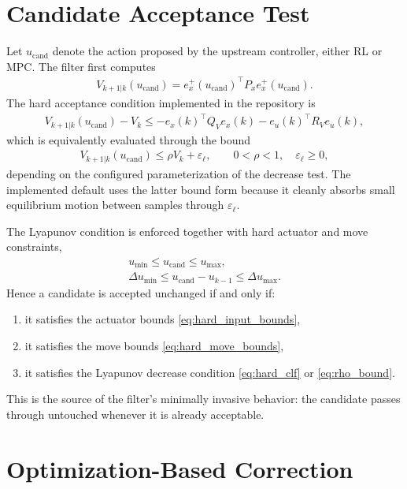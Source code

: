 \documentclass[11pt]{article}
\begin{document}
\section{Candidate Acceptance Test}
Let $u_{\mathrm{cand}}$ denote the action proposed by the upstream controller, either RL or MPC. The filter first computes
\begin{align}
V_{k+1|k}(u_{\mathrm{cand}})
= e_x^+(u_{\mathrm{cand}})^\top P_x e_x^+(u_{\mathrm{cand}}). \label{eq:V_next_cand}
\end{align}
The hard acceptance condition implemented in the repository is
\begin{align}
V_{k+1|k}(u_{\mathrm{cand}}) - V_k
\le
-e_x(k)^\top Q_V e_x(k) - e_u(k)^\top R_V e_u(k), \label{eq:hard_clf}
\end{align}
which is equivalently evaluated through the bound
\begin{align}
V_{k+1|k}(u_{\mathrm{cand}}) \le \rho V_k + \varepsilon_{\ell}, \qquad 0 < \rho < 1, \quad \varepsilon_{\ell}\ge 0, \label{eq:rho_bound}
\end{align}
depending on the configured parameterization of the decrease test. The implemented default uses the latter bound form because it cleanly absorbs small equilibrium motion between samples through $\varepsilon_{\ell}$.

The Lyapunov condition is enforced together with hard actuator and move constraints,
\begin{align}
u_{\min} \le u_{\mathrm{cand}} \le u_{\max}, \label{eq:hard_input_bounds}\\
\Delta u_{\min} \le u_{\mathrm{cand}} - u_{k-1} \le \Delta u_{\max}. \label{eq:hard_move_bounds}
\end{align}
Hence a candidate is accepted unchanged if and only if:
\begin{enumerate}[leftmargin=*]
\item it satisfies the actuator bounds \eqref{eq:hard_input_bounds},
\item it satisfies the move bounds \eqref{eq:hard_move_bounds},
\item it satisfies the Lyapunov decrease condition \eqref{eq:hard_clf} or \eqref{eq:rho_bound}.
\end{enumerate}
This is the source of the filter's minimally invasive behavior: the candidate passes through untouched whenever it is already acceptable.

\section{Optimization-Based Correction}
\end{document}
